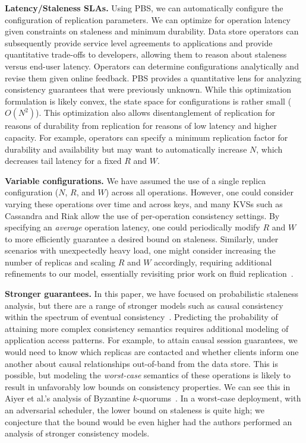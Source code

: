 \documentclass{vldb}
\begin{document}
\textbf{Latency/Staleness SLAs.} Using PBS, we can automatically
configure the configuration of replication parameters.  We can
optimize for operation latency given constraints on staleness and
minimum durability.  Data store operators can subsequently provide
service level agreements to applications and provide quantitative
trade-offs to developers, allowing them to reason about staleness
versus end-user latency.  Operators can determine configurations
analytically and revise them given online feedback.  PBS provides a
quantitative lens for analyzing consistency guarantees that were
previously unknown.  While this optimization formulation is likely
convex, the state space for configurations is rather small ($O(N^2)$).
This optimization also allows disentanglement of replication for
reasons of durability from replication for reasons of low latency and
higher capacity.  For example, operators can specify a minimum
replication factor for durability and availability but may want to
automatically increase $N$, which decreases tail latency for a fixed
$R$ and $W$.

\textbf{Variable configurations.} We have assumed the use of a single
replica configuration ($N$, $R$, and $W$) across all operations.
However, one could consider varying these operations over time and
across keys, and many KVSs such as Cassandra and Riak allow the use of
per-operation consistency settings.  By specifying an \textit{average}
operation latency, one could periodically modify $R$ and $W$ to more
efficiently guarantee a desired bound on staleness.  Similarly, under
scenarios with unexpectedly heavy load, one might consider increasing
the number of replicas and scaling $R$ and $W$ accordingly, requiring
additional refinements to our model, essentially revisiting prior work
on fluid replication~\cite{fluidreplication}.

\textbf{Stronger guarantees.} In this paper, we have focused on
probabilistic staleness analysis, but there are a range of stronger
models such as causal consistency within the spectrum of eventual
consistency~\cite{vogels-defs}.  Predicting the probability of
attaining more complex consistency semantics requires additional
modeling of application access patterns.  For example, to attain
causal session guarantees, we would need to know which replicas are
contacted and whether clients inform one another about causal
relationships out-of-band from the data store.  This is possible, but
modeling the \textit{worst-case} semantics of these operations is
likely to result in unfavorably low bounds on consistency properties.
We can see this in Aiyer et al.'s analysis of Byzantine
$k$-quorums~\cite{multi-k-quorum}.  In a worst-case deployment, with
an adversarial scheduler, the lower bound on staleness is quite high;
we conjecture that the bound would be even higher had the authors
performed an analysis of stronger consistency models.
\end{document}
